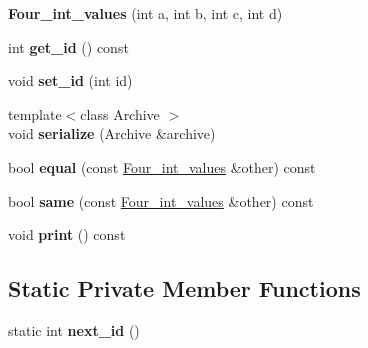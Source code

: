 \begin{DoxyCompactItemize}
\item 
{\bfseries Four\+\_\+int\+\_\+values} (int a, int b, int c, int d)\hypertarget{classshared__memory_1_1Four__int__values_a28e7fda257450d7650926ae4cec8ea21}{}\label{classshared__memory_1_1Four__int__values_a28e7fda257450d7650926ae4cec8ea21}

\item 
int {\bfseries get\+\_\+id} () const \hypertarget{classshared__memory_1_1Four__int__values_a9eb6dd806c312fad3d53a56b69a1e998}{}\label{classshared__memory_1_1Four__int__values_a9eb6dd806c312fad3d53a56b69a1e998}

\item 
void {\bfseries set\+\_\+id} (int id)\hypertarget{classshared__memory_1_1Four__int__values_aa9904f00f9ae680bab360954e5f3f7a9}{}\label{classshared__memory_1_1Four__int__values_aa9904f00f9ae680bab360954e5f3f7a9}

\item 
{\footnotesize template$<$class Archive $>$ }\\void {\bfseries serialize} (Archive \&archive)\hypertarget{classshared__memory_1_1Four__int__values_ae19116850c04d24ce74dc28bd9cbcf39}{}\label{classshared__memory_1_1Four__int__values_ae19116850c04d24ce74dc28bd9cbcf39}

\item 
bool {\bfseries equal} (const \hyperlink{classshared__memory_1_1Four__int__values}{Four\+\_\+int\+\_\+values} \&other) const \hypertarget{classshared__memory_1_1Four__int__values_a5b9e19983f81b1de322b9342eb10630b}{}\label{classshared__memory_1_1Four__int__values_a5b9e19983f81b1de322b9342eb10630b}

\item 
bool {\bfseries same} (const \hyperlink{classshared__memory_1_1Four__int__values}{Four\+\_\+int\+\_\+values} \&other) const \hypertarget{classshared__memory_1_1Four__int__values_a91a3831a5ac3437a52a1dfb0138054d5}{}\label{classshared__memory_1_1Four__int__values_a91a3831a5ac3437a52a1dfb0138054d5}

\item 
void {\bfseries print} () const \hypertarget{classshared__memory_1_1Four__int__values_ae21af043113ba3dae775d0a47cccdbe3}{}\label{classshared__memory_1_1Four__int__values_ae21af043113ba3dae775d0a47cccdbe3}

\end{DoxyCompactItemize}
\subsection*{Static Private Member Functions}
\begin{DoxyCompactItemize}
\item 
static int {\bfseries next\+\_\+id} ()\hypertarget{classshared__memory_1_1Four__int__values_a2b34bc8100ec157982d0c6d7a1df14de}{}\label{classshared__memory_1_1Four__int__values_a2b34bc8100ec157982d0c6d7a1df14de}

\end{DoxyCompactItemize}
